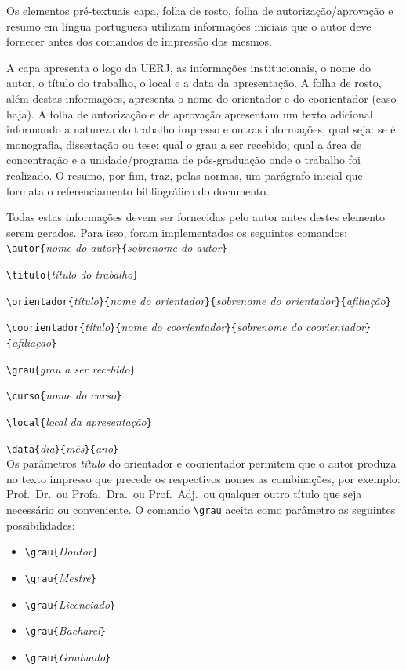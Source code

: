 \documentclass[a4paper,12pt,oneside,onecolumn]{article}
\newcommand{\comando}[1]{\texttt{\textbackslash #1}}
\newcommand{\param}[1]{\texttt{\{}\textsl{#1}\texttt{\}}}
\begin{document}
Os elementos pré-textuais capa, folha de rosto, folha de autorização/aprovação e resumo em língua portuguesa utilizam informações iniciais que o autor deve fornecer antes dos comandos de impressão dos mesmos.

A capa apresenta o logo da UERJ, as informações institucionais, o nome do autor, o título do trabalho, o local e a data da apresentação. A folha de rosto, além destas informações, apresenta o nome do orientador e do coorientador (caso haja). A folha de autorização e de aprovação apresentam um texto adicional informando a natureza do trabalho impresso e outras informações, qual seja: se é monografia, dissertação ou tese; qual o grau a ser recebido; qual a área de concentração e a unidade/programa de pós-graduação onde o trabalho foi realizado. O resumo, por fim, traz, pelas normas, um parágrafo inicial que formata o referenciamento bibliográfico do documento.

Todas estas informações devem ser fornecidas pelo autor antes destes elemento serem gerados. Para isso, foram implementados os seguintes comandos:\\

\comando{autor}\param{nome do autor}\param{sobrenome do autor}

\comando{titulo}\param{título do trabalho}

\comando{orientador}\param{título}\param{nome do orientador}\param{sobrenome do orientador}\param{afiliação}

\comando{coorientador}\param{título}\param{nome do coorientador}\param{sobrenome do coorientador}\param{a\-fi\-li\-a\-ção}

\comando{grau}\param{grau a ser recebido}

\comando{curso}\param{nome do curso}

\comando{local}\param{local da apresentação}

\comando{data}\param{dia}\param{mês}\param{ano}\\

Os parâmetros \textsl{título} do orientador e coorientador permitem que o autor produza no texto impresso que precede os respectivos nomes as combinações, por exemplo: Prof.\ Dr.\ ou Profa.\ Dra.\ ou Prof.\ Adj.\ ou qualquer outro título que seja necessário ou conveniente. O comando \comando{grau} aceita como parâmetro as seguintes possibilidades:

\begin{itemize}
  \item \comando{grau}\param{Doutor}
  \item \comando{grau}\param{Mestre}
  \item \comando{grau}\param{Licenciado}
  \item \comando{grau}\param{Bacharel}
  \item \comando{grau}\param{Graduado}\\
\end{itemize}
\end{document}
